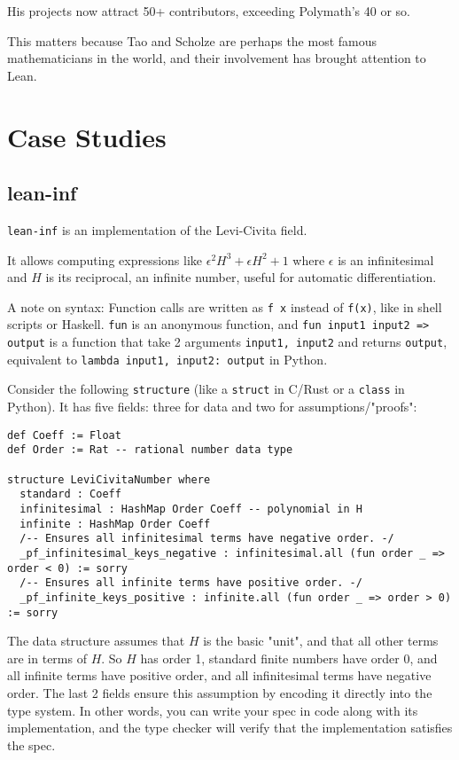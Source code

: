 \documentclass{article}
\begin{document}

His projects now attract 50+ contributors, exceeding Polymath's 40 or so.

This matters because Tao and Scholze are perhaps the most famous mathematicians in the world, and their involvement has brought attention to Lean.

\section{Case Studies}
\subsection{lean-inf}
\texttt{lean-inf} is an implementation of the Levi-Civita field\cite{wikipedia}\cite{http://www2.physics.umanitoba.ca/u/khodr/Publications/RS-Overview-offprints.pdf}.

It allows computing expressions like $\epsilon^2 H^3 + \epsilon H^2 + 1$ where $\epsilon$ is an infinitesimal and $H$ is its reciprocal, an infinite number, useful for automatic differentiation.

A note on syntax: Function calls are written as \texttt{f x} instead of \texttt{f(x)}, like in shell scripts or Haskell. \texttt{fun} is an anonymous function, and \texttt{fun input1 input2 => output} is a function that take 2 arguments \texttt{input1, input2} and returns \texttt{output}, equivalent to \texttt{lambda input1, input2: output} in Python.

Consider the following \texttt{structure} (like a \texttt{struct} in C/Rust or a \texttt{class} in Python). It has five fields: three for data and two for assumptions/"proofs":

\begin{verbatim}
def Coeff := Float
def Order := Rat -- rational number data type

structure LeviCivitaNumber where
  standard : Coeff
  infinitesimal : HashMap Order Coeff -- polynomial in H
  infinite : HashMap Order Coeff
  /-- Ensures all infinitesimal terms have negative order. -/
  _pf_infinitesimal_keys_negative : infinitesimal.all (fun order _ => order < 0) := sorry
  /-- Ensures all infinite terms have positive order. -/
  _pf_infinite_keys_positive : infinite.all (fun order _ => order > 0) := sorry
\end{verbatim}

The data structure assumes that $H$ is the basic "unit", and that all other terms are in terms of $H$. So $H$ has order 1, standard finite numbers have order 0, and all infinite terms have positive order, and all infinitesimal terms have negative order. The last 2 fields ensure this assumption by encoding it directly into the type system. In other words, you can write your spec in code along with its implementation, and the type checker will verify that the implementation satisfies the spec.
\end{document}
